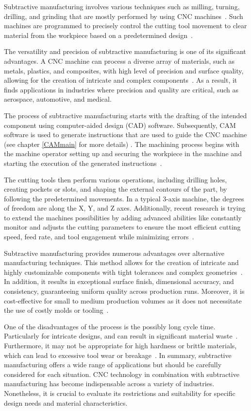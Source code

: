 Subtractive manufacturing involves various techniques such as milling, turning, drilling, and grinding that are mostly performed by using CNC machines~\cite{Kumar.2020}. Such machines are programmed to precisely control the cutting tool movement to clear material from the workpiece based on a predetermined design~\cite{Amanullah.2017}.

The versatility and precision of subtractive manufacturing is one of its significant advantages. A CNC machine can process a diverse array of materials, such as metals, plastics, and composites, with high level of precision and surface quality, allowing for the creation of intricate and complex components~\cite{Tomaz.2021,Yang.2019}. As a result, it finds applications in industries where precision and quality are critical, such as aerospace, automotive, and medical.

The process of subtractive manufacturing starts with the drafting of the intended component using computer-aided design (CAD) software. Subsequently, CAM software is used to generate instructions that are used to guide the CNC machine (see chapter \ref{CAMmain} for more details) . The machining process begins with the machine operator setting up and securing the workpiece in the machine and starting the execution of the generated instructions~\cite{Nee.2015}.

The cutting tools then perform various operations, including drilling holes, creating pockets or slots, and shaping the external contours of the part, by following the predetermined movements. In a typical 3-axis machine, the degrees of freedom are along the X, Y, and Z axes. Additionally, recent research is trying to extend the machines possibilities by adding advanced abilities like constantly monitor and adjusts the cutting parameters to ensure the most efficient cutting speed, feed rate, and tool engagement while minimizing errors~\cite{Tien.2021}.


Subtractive manufacturing provides numerous advantages over alternative manufacturing techniques. This method allows for the creation of intricate and highly customizable components with tight tolerances and complex geometries~\cite{Jayawardane.2023}. In addition, it results in exceptional surface finish, dimensional accuracy, and consistency, guaranteeing uniform quality across production runs. Moreover, it is cost-effective for small to medium production volumes as it does not necessitate the use of costly molds or tooling~\cite{Gu.2018}.

One of the disadvantages of the process is the possibly long cycle time. Particularly for intricate designs, and can result in significant material waste~\cite{Faludi.2015}. Furthermore, it may not be appropriate for high hardness or brittle materials, which can lead to excessive tool wear or breakage~\cite{Hesser.2019}. In summary, subtractive manufacturing offers a wide range of applications but should be carefully considered for each situation. CNC technology in combination with subtractive manufacturing has become indispensable across a variety of industries. Nonetheless, it is crucial to evaluate its restrictions and suitability for specific design needs and material characteristics.


